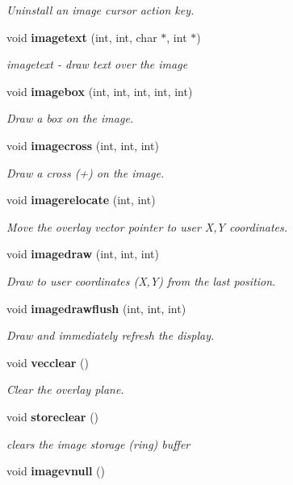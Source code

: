 \begin{CompactItemize}
\begin{CompactList}\small\item\em Uninstall an image cursor action key. \item\end{CompactList}\item 
void {\bf imagetext} (int, int, char $\ast$, int $\ast$)
\begin{CompactList}\small\item\em imagetext - draw text over the image \item\end{CompactList}\item 
void {\bf imagebox} (int, int, int, int, int)
\begin{CompactList}\small\item\em Draw a box on the image. \item\end{CompactList}\item 
void {\bf imagecross} (int, int, int)
\begin{CompactList}\small\item\em Draw a cross (+) on the image. \item\end{CompactList}\item 
void {\bf imagerelocate} (int, int)
\begin{CompactList}\small\item\em Move the overlay vector pointer to user X,Y coordinates. \item\end{CompactList}\item 
void {\bf imagedraw} (int, int, int)
\begin{CompactList}\small\item\em Draw to user coordinates (X,Y) from the last position. \item\end{CompactList}\item 
void {\bf imagedrawflush} (int, int, int)
\begin{CompactList}\small\item\em Draw and immediately refresh the display. \item\end{CompactList}\item 
void {\bf vecclear} ()
\begin{CompactList}\small\item\em Clear the overlay plane. \item\end{CompactList}\item 
void {\bf storeclear} ()
\begin{CompactList}\small\item\em clears the image storage (ring) buffer \item\end{CompactList}\item 
void {\bf imagevnull} ()\label{xtv_8h_a77}


\end{CompactItemize}
